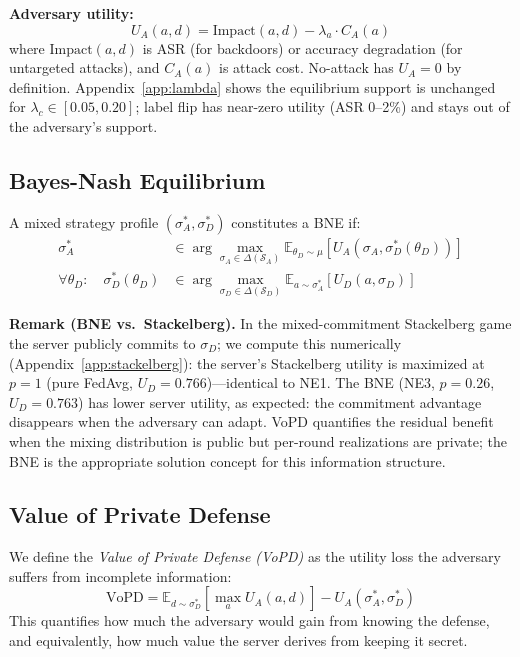 \documentclass{article}
\newcommand{\SA}{\mathcal{S}_A}
\newcommand{\SD}{\mathcal{S}_D}
\newcommand{\UA}{U_A}
\newcommand{\UD}{U_D}
\newcommand{\thetaD}{\theta_D}
\begin{document}
\textbf{Adversary utility:}
\begin{equation}
    \UA(a, d) = \text{Impact}(a, d) - \lambda_a \cdot C_A(a)
    \label{eq:adv_utility}
\end{equation}
where $\text{Impact}(a, d)$ is ASR (for backdoors) or accuracy degradation (for untargeted attacks), and $C_A(a)$ is attack cost. No-attack has $\UA = 0$ by definition. Appendix~\ref{app:lambda} shows the equilibrium support is unchanged for $\lambda_c \in [0.05, 0.20]$; label flip has near-zero utility (ASR 0--2\%) and stays out of the adversary's support.

\subsection{Bayes-Nash Equilibrium}

A mixed strategy profile $(\sigma_A^*, \sigma_D^*)$ constitutes a BNE if:
\begin{align}
    \sigma_A^* &\in \arg\max_{\sigma_A \in \Delta(\SA)} \mathbb{E}_{\thetaD \sim \mu}\left[\UA(\sigma_A, \sigma_D^*(\thetaD))\right] \label{eq:bne_adv}\\
    \forall \thetaD: \quad \sigma_D^*(\thetaD) &\in \arg\max_{\sigma_D \in \Delta(\SD)} \mathbb{E}_{a \sim \sigma_A^*}\left[\UD(a, \sigma_D)\right] \label{eq:bne_srv}
\end{align}

\textbf{Remark (BNE vs.\ Stackelberg).} In the mixed-commitment Stackelberg game the server publicly commits to $\sigma_D$; we compute this numerically (Appendix~\ref{app:stackelberg}): the server's Stackelberg utility is maximized at $p=1$ (pure FedAvg, $U_D=0.766$)---identical to NE1. The BNE (NE3, $p=0.26$, $U_D=0.763$) has lower server utility, as expected: the commitment advantage disappears when the adversary can adapt. VoPD quantifies the residual benefit when the mixing distribution is public but per-round realizations are private; the BNE is the appropriate solution concept for this information structure.

\subsection{Value of Private Defense}

We define the \emph{Value of Private Defense (VoPD)} as the utility loss the adversary suffers from incomplete information:
\begin{equation}
    \text{VoPD} = \mathbb{E}_{d \sim \sigma_D^*}\left[\max_a \UA(a, d)\right] - \UA(\sigma_A^*, \sigma_D^*)
    \label{eq:vopd}
\end{equation}
This quantifies how much the adversary would gain from knowing the defense, and equivalently, how much value the server derives from keeping it secret.
\end{document}
